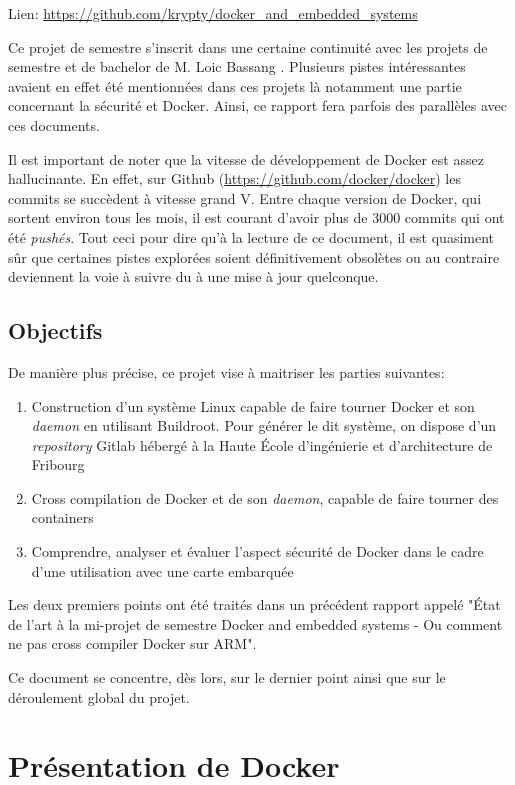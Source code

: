 \documentclass[11pt,a4paper,oneside]{report}
\newcommand{\school}{Haute École d'ingénierie et d'architecture de Fribourg}
\newcommand{\oldreportname}{État de l’art à la mi-projet de semestre Docker and embedded systems - Ou comment ne pas cross compiler Docker sur ARM}
\begin{document}
Lien: \url{https://github.com/krypty/docker_and_embedded_systems}

Ce projet de semestre s'inscrit dans une certaine continuité avec les projets de semestre et de bachelor de M. Loic Bassang \cite{bassang_bachelor}. Plusieurs pistes intéressantes avaient en effet été mentionnées dans ces projets là notamment une partie concernant la sécurité et Docker. Ainsi, ce rapport fera parfois des parallèles avec ces documents.

Il est important de noter que la vitesse de développement de Docker est assez hallucinante. En effet, sur Github (\url{https://github.com/docker/docker}) les commits se succèdent à vitesse grand V. Entre chaque version de Docker, qui sortent environ tous les mois, il est courant d'avoir plus de 3000 commits qui ont été \emph{pushés}. Tout ceci pour dire qu'à la lecture de ce document, il est quasiment sûr que certaines pistes explorées soient définitivement obsolètes ou au contraire deviennent la voie à suivre du à une mise à jour quelconque.


\section{Objectifs}

De manière plus précise, ce projet vise à maitriser les parties suivantes:

\begin{enumerate}
  \item Construction d'un système Linux capable de faire tourner Docker et son \emph{daemon} en utilisant Buildroot. Pour générer le dit système, on dispose d'un \emph{repository} Gitlab hébergé à la \school

  \item Cross compilation de Docker et de son \emph{daemon}, capable de faire tourner des containers
  
  \item Comprendre, analyser et évaluer l'aspect sécurité de Docker dans le cadre d'une utilisation avec une carte embarquée
\end{enumerate}

Les deux premiers points ont été traités dans un précédent rapport appelé "\oldreportname".

Ce document se concentre, dès lors, sur le dernier point ainsi que sur le déroulement global du projet.


\chapter{Présentation de Docker}
\end{document}
